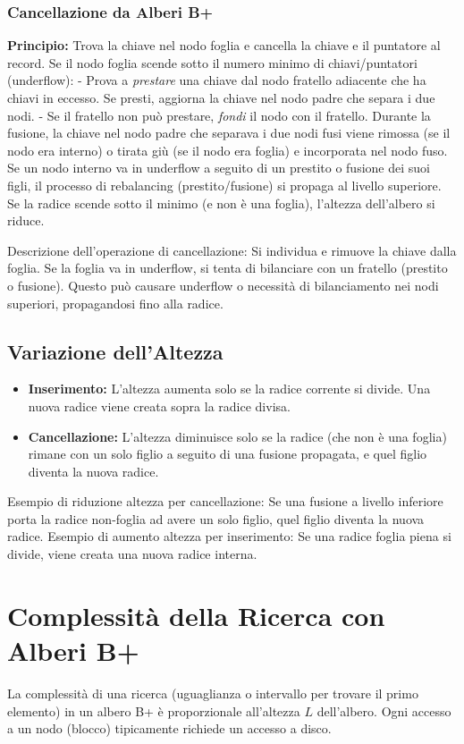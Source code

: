 \subsubsection{Cancellazione da Alberi B+}
\textbf{Principio:} Trova la chiave nel nodo foglia e cancella la chiave e il puntatore al record. Se il nodo foglia scende sotto il numero minimo di chiavi/puntatori (underflow):
- Prova a \textit{prestare} una chiave dal nodo fratello adiacente che ha chiavi in eccesso. Se presti, aggiorna la chiave nel nodo padre che separa i due nodi.
- Se il fratello non può prestare, \textit{fondi} il nodo con il fratello. Durante la fusione, la chiave nel nodo padre che separava i due nodi fusi viene rimossa (se il nodo era interno) o tirata giù (se il nodo era foglia) e incorporata nel nodo fuso.
Se un nodo interno va in underflow a seguito di un prestito o fusione dei suoi figli, il processo di rebalancing (prestito/fusione) si propaga al livello superiore. Se la radice scende sotto il minimo (e non è una foglia), l'altezza dell'albero si riduce.

Descrizione dell'operazione di cancellazione: Si individua e rimuove la chiave dalla foglia. Se la foglia va in underflow, si tenta di bilanciare con un fratello (prestito o fusione). Questo può causare underflow o necessità di bilanciamento nei nodi superiori, propagandosi fino alla radice.

\subsection{Variazione dell'Altezza}
\begin{itemize}
    \item \textbf{Inserimento:} L'altezza aumenta solo se la radice corrente si divide. Una nuova radice viene creata sopra la radice divisa.
    \item \textbf{Cancellazione:} L'altezza diminuisce solo se la radice (che non è una foglia) rimane con un solo figlio a seguito di una fusione propagata, e quel figlio diventa la nuova radice.
\end{itemize}

Esempio di riduzione altezza per cancellazione: Se una fusione a livello inferiore porta la radice non-foglia ad avere un solo figlio, quel figlio diventa la nuova radice.
Esempio di aumento altezza per inserimento: Se una radice foglia piena si divide, viene creata una nuova radice interna.

\section{Complessità della Ricerca con Alberi B+}
La complessità di una ricerca (uguaglianza o intervallo per trovare il primo elemento) in un albero B+ è proporzionale all'altezza $L$ dell'albero. Ogni accesso a un nodo (blocco) tipicamente richiede un accesso a disco.

